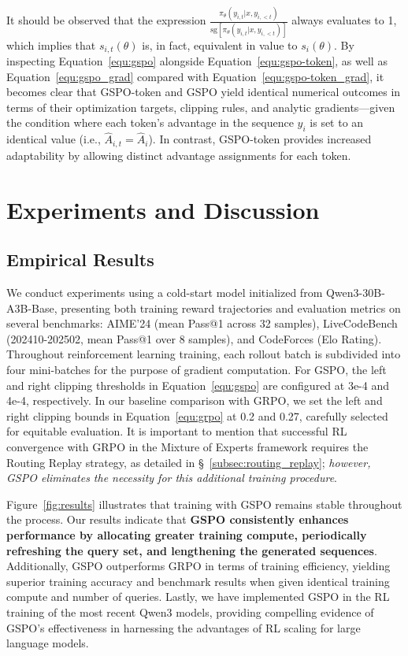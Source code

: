 It should be observed that the expression $\frac{ \pi_{\theta} (y_{i,t} | x, y_{i,<t}) }{ \mathrm{sg} \left[ \pi_{\theta} (y_{i,t} | x, y_{i,<t}) \right] }$ always evaluates to 1, which implies that $s_{i,t}(\theta)$ is, in fact, equivalent in value to $s_{i}(\theta)$. By inspecting Equation~\eqref{equ:gspo} alongside Equation~\eqref{equ:gspo-token}, as well as Equation~\eqref{equ:gspo_grad} compared with Equation~\eqref{equ:gspo-token_grad}, it becomes clear that GSPO-token and GSPO yield identical numerical outcomes in terms of their optimization targets, clipping rules, and analytic gradients—given the condition where each token’s advantage in the sequence $y_i$ is set to an identical value (i.e., $\widehat{A}_{i,t} = \widehat{A}_{i}$). In contrast, GSPO-token provides increased adaptability by allowing distinct advantage assignments for each token.

\section{Experiments and Discussion}

\subsection{Empirical Results}

We conduct experiments using a cold-start model initialized from Qwen3-30B-A3B-Base, presenting both training reward trajectories and evaluation metrics on several benchmarks: AIME'24 (mean Pass@1 across 32 samples), LiveCodeBench (202410-202502, mean Pass@1 over 8 samples), and CodeForces (Elo Rating). Throughout reinforcement learning training, each rollout batch is subdivided into four mini-batches for the purpose of gradient computation. For GSPO, the left and right clipping thresholds in Equation~\eqref{equ:gspo} are configured at 3e-4 and 4e-4, respectively. In our baseline comparison with GRPO, we set the left and right clipping bounds in Equation~\eqref{equ:grpo} at 0.2 and 0.27, carefully selected for equitable evaluation. It is important to mention that successful RL convergence with GRPO in the Mixture of Experts framework requires the Routing Replay strategy, as detailed in \S~\ref{subsec:routing_replay}; \textit{however, GSPO eliminates the necessity for this additional training procedure}.

Figure~\ref{fig:results} illustrates that training with GSPO remains stable throughout the process. Our results indicate that \textbf{GSPO consistently enhances performance by allocating greater training compute, periodically refreshing the query set, and lengthening the generated sequences}. Additionally, GSPO outperforms GRPO in terms of training efficiency, yielding superior training accuracy and benchmark results when given identical training compute and number of queries. Lastly, we have implemented GSPO in the RL training of the most recent Qwen3 models, providing compelling evidence of GSPO's effectiveness in harnessing the advantages of RL scaling for large language models.

